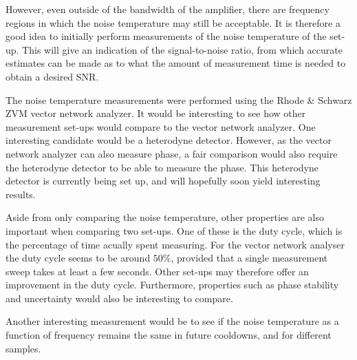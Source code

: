 However, even outside of the bandwidth of the amplifier, there are frequency regions in which the noise temperature may still be acceptable. It is therefore a good idea to initially perform measurements of the noise temperature of the set-up. This will give an indication of the signal-to-noise ratio, from which accurate estimates can be made as to what the amount of measurement time is needed to obtain a desired SNR.

The noise temperature measurements were performed using the Rhode \& Schwarz ZVM vector network analyzer. It would be interesting to see how other measurement set-ups would compare to the vector network analyzer. One interesting candidate would be a heterodyne detector. However, as the vector network analyzer can also measure phase, a fair comparison would also require the heterodyne detector to be able to measure the phase. This heterodyne detector is currently being set up, and will hopefully soon yield interesting results.

Aside from only comparing the noise temperature, other properties are also important when comparing two set-ups. One of these is the duty cycle, which is the percentage of time acually spent measuring. For the vector network analyser the duty cycle seems to be around $50\%$, provided that a single measurement sweep takes at least a few seconds. Other set-ups may therefore offer an improvement in the duty cycle. Furthermore, properties such as phase stability and uncertainty would also be interesting to compare.

Another interesting measurement would be to see if the noise temperature as a function of frequency remains the same in future cooldowns, and for different samples.

